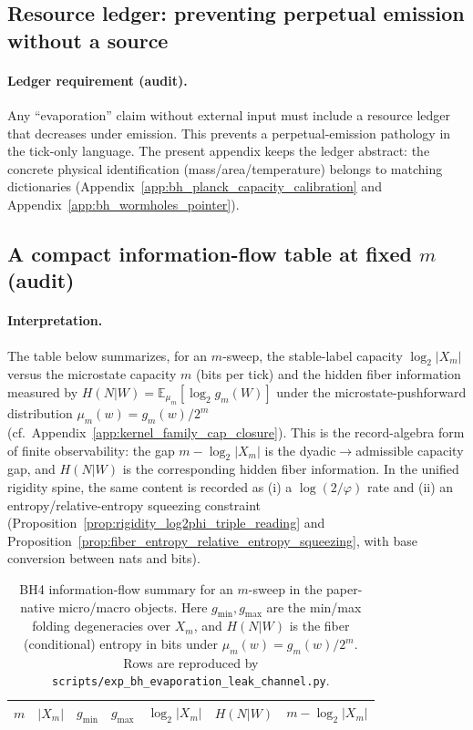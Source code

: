 \subsection{Resource ledger: preventing perpetual emission without a source}
\label{subsec:bh4_resource_ledger}

\paragraph{Ledger requirement (audit).}
\AuditTag Any ``evaporation'' claim without external input must include a resource ledger that decreases
under emission. This prevents a perpetual-emission pathology in the tick-only language.
The present appendix keeps the ledger abstract: the concrete physical identification (mass/area/temperature)
belongs to matching dictionaries (Appendix~\ref{app:bh_planck_capacity_calibration} and Appendix~\ref{app:bh_wormholes_pointer}).

\subsection{A compact information-flow table at fixed \texorpdfstring{$m$}{m} (audit)}
\label{subsec:bh4_information_flow_table}

\paragraph{Interpretation.}
\AuditTag The table below summarizes, for an $m$-sweep, the stable-label capacity $\log_2|X_m|$ versus the
microstate capacity $m$ (bits per tick) and the hidden fiber information measured by
$H(N|W)=\mathbb{E}_{\mu_m}[\log_2 g_m(W)]$ under the microstate-pushforward distribution
$\mu_m(w)=g_m(w)/2^m$ (cf.\ Appendix~\ref{app:kernel_family_cap_closure}).
\AuditTag This is the record-algebra form of finite observability:
the gap $m-\log_2|X_m|$ is the dyadic$\to$admissible capacity gap, and $H(N|W)$ is the corresponding hidden fiber information.
In the unified rigidity spine, the same content is recorded as (i) a $\log(2/\varphi)$ rate and (ii) an entropy/relative-entropy squeezing constraint
(Proposition~\ref{prop:rigidity_log2phi_triple_reading} and Proposition~\ref{prop:fiber_entropy_relative_entropy_squeezing}, with base conversion between nats and bits).

\begin{table}[t]
\centering
\scriptsize
\setlength{\tabcolsep}{6pt}
\renewcommand{\arraystretch}{1.15}
\begin{tabular}{r r r r r r r}
\toprule
$m$ & $|X_m|$ & $g_{\min}$ & $g_{\max}$ & $\log_2|X_m|$ & $H(N|W)$ & $m-\log_2|X_m|$ \\
\midrule
%
\end{tabular}
\caption{BH4 information-flow summary for an $m$-sweep in the paper-native micro/macro objects.
Here $g_{\min},g_{\max}$ are the min/max folding degeneracies over $X_m$, and
$H(N|W)$ is the fiber (conditional) entropy in bits under $\mu_m(w)=g_m(w)/2^m$.
Rows are reproduced by \texttt{scripts/exp\_bh\_evaporation\_leak\_channel.py}.}
\label{tab:bh4_information_flow}
\end{table}

